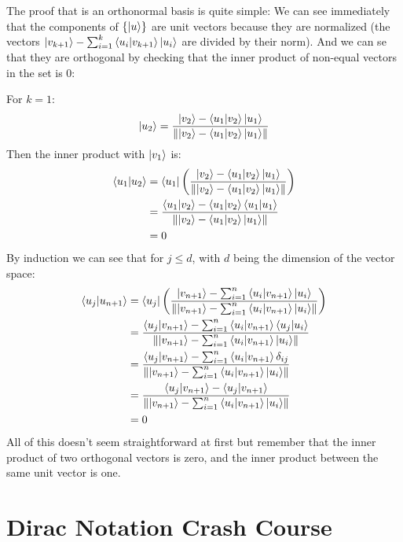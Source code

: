 The proof that is an orthonormal basis is quite simple: 
We can see immediately that the components of $\{ \ket{u} \}$ are unit vectors because they are normalized (the vectors $\ket{v_{k+1}} - \sum_{i=1}^{k} \bra{u_i}\ket{v_{k+1}}\ket{u_i}$ are divided by their norm). And we can se that they are orthogonal by checking that the inner product of non-equal vectors in the set is 0: 

For $k=1$:
$$
\ket{u_2} = \frac{\ket{v_2} - \bra{u_1}\ket{v_2}\ket{u_1}}{\norm{\ket{v_2} - \bra{u_1}\ket{v_2}\ket{u_1}}}
$$
Then the inner product with $\ket{v_1}$ is:
$$
\begin{aligned}
\bra{u_1}\ket{u_2} 
&= \bra{u_1} \left( \frac{\ket{v_2} - \bra{u_1}\ket{v_2}\ket{u_1}}{\norm{\ket{v_2} - \bra{u_1}\ket{v_2}\ket{u_1}}} \right) \\
&= \frac{\bra{u_1}\ket{v_2} - \bra{u_1}\ket{v_2}\bra{u_1}\ket{u_1}}{\norm{\ket{v_2} - \bra{u_1}\ket{v_2}\ket{u_1}}} \\
&= 0
\end{aligned}
$$
By induction we can see that for $j \leq d$, with $d$ being the dimension of the vector space:
$$
\begin{aligned}
	\bra{u_j}\ket{u_{n+1}} 
	& = \bra{u_j} \left( \frac{\ket{v_{n+1}} - \sum_{i=1}^{n} \bra{u_i}\ket{v_{n+1}}\ket{u_i}}{\norm{\ket{v_{n+1}} - \sum_{i=1}^{n} \bra{u_i}\ket{v_{n+1}}\ket{u_i}}} \right) \\
	& = \frac{\bra{u_j}\ket{v_{n+1}} - \sum_{i=1}^{n} \bra{u_i}\ket{v_{n+1}} \bra{u_j}\ket{u_i}}{\norm{\ket{v_{n+1}} - \sum_{i=1}^{n} \bra{u_i}\ket{v_{n+1}} \ket{u_i}}} \\
	& = \frac{\bra{u_j}\ket{v_{n+1}} - \sum_{i=1}^{n} \bra{u_i}\ket{v_{n+1}} \delta_{ij}}{\norm{\ket{v_{n+1}} - \sum_{i=1}^{n} \bra{u_i}\ket{v_{n+1}} \ket{u_i}}} \\
	& = \frac{\bra{u_j}\ket{v_{n+1}} - \bra{u_j}\ket{v_{n+1}}}{\norm{\ket{v_{n+1}} - \sum_{i=1}^{n} \bra{u_i}\ket{v_{n+1}} \ket{u_i}}} \\
	& = 0	\\
\end{aligned}
$$
All of this doesn't seem straightforward at first but remember that the inner product of two orthogonal vectors is zero, and the inner product between the same unit vector is one. 

\section{Dirac Notation Crash Course}

